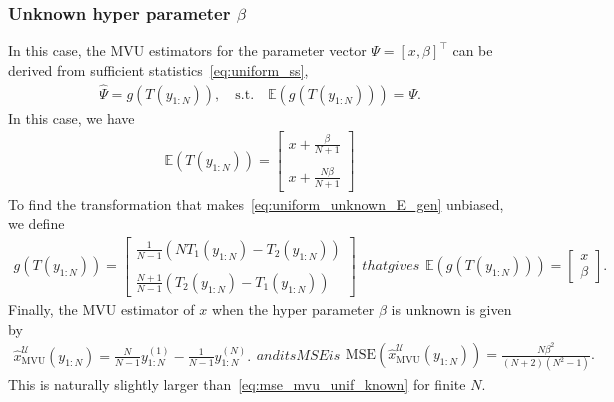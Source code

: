 \documentclass{article}
\newcommand{\E}{\mathbb{E}}
\newcommand{\MSE}{\mathrm{MSE}}
\begin{document}
\subsubsection{Unknown hyper parameter $\beta$}\label{subsec:unknown_hyper_parameter_uniform}
In this case, the MVU estimators for the parameter vector $\Psi=[x,\beta]^\top$ can be derived from sufficient statistics~\eqref{eq:uniform_ss},
%
%
\begin{align}
\hat{\Psi}=g(T(y_{1:N})),\quad \mathrm{s.t.}\quad \E\left(g\left(T(y_{1:N})\right)\right) = \Psi.
\end{align}
%
%
In this case, we have
%
%
\begin{align}
\E(T(y_{1:N})) = \begin{bmatrix}
x+\frac{\beta}{N+1}\\\\x+\frac{N\beta}{N+1}
\end{bmatrix}
\label{eq:uniform_unknown_E_gen}
\end{align}
%
%
To find the transformation that makes~\eqref{eq:uniform_unknown_E_gen} unbiased, we define
%
%
\begin{subequations}
	\begin{align}
	g(T(y_{1:N}))=\begin{bmatrix}\frac{1}{N-1}\left(NT_1(y_{1:N})-T_2(y_{1:N})\right)\\\\	\frac{N+1}{N-1}\left(T_2(y_{1:N})-T_1(y_{1:N})\right)\end{bmatrix}
	\end{align}
	that gives
	\begin{align}
	\E\left(g(T(y_{1:N}))\right) = \begin{bmatrix}x\\\beta\end{bmatrix}.
	\end{align}
\end{subequations}
Finally, the MVU estimator of $x$ when the hyper parameter $\beta$ is unknown is given by
\begin{subequations}
	\begin{align}
	\hat{x}_{\mathrm{MVU}}^{\mathcal{U}}(y_{1:N}) = \frac{N}{N-1}y^{(1)}_{1:N} - \frac{1}{N-1} y^{(N)}_{1:N}.
	\end{align}
	and its MSE is
	\begin{align}
	\MSE\left(\hat{x}_{\mathrm{MVU}}^{\mathcal{U}}(y_{1:N})\right) = \frac{N\beta^2}{(N+2)(N^2-1)}.
	\end{align}
\end{subequations}
%
%
This is naturally slightly larger than~\eqref{eq:mse_mvu_unif_known} for finite $N$.
\end{document}
